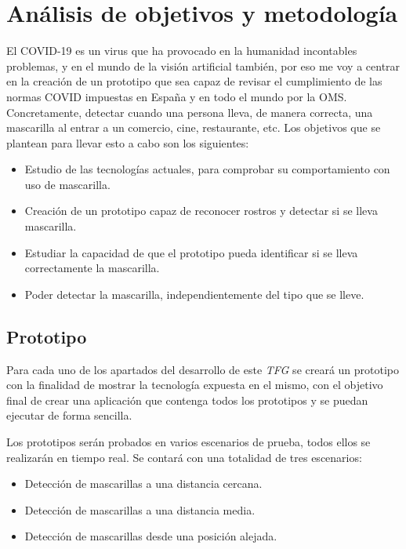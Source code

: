 
\lstset{frame=single,basicstyle=\ttfamily\small}

\chapter{Análisis de objetivos y metodología}
\vspace{-1cm}
El COVID-19 es un virus que ha provocado en la humanidad incontables problemas, y en el mundo de la visión artificial también, por eso me voy a centrar en la creación de un prototipo que sea capaz de revisar el cumplimiento de las normas COVID impuestas en España y en todo el mundo por la OMS. Concretamente, detectar cuando una persona lleva, de manera correcta, una mascarilla al entrar a un comercio, cine, restaurante, etc. Los objetivos que se plantean para llevar esto a cabo son los siguientes:

\begin{itemize}
	\item Estudio de las tecnologías actuales, para comprobar su comportamiento con uso de mascarilla.
	\item Creación de un prototipo capaz de reconocer rostros y detectar si se lleva mascarilla.
	\item Estudiar la capacidad de que el prototipo pueda identificar si se lleva correctamente la mascarilla. 
	\item Poder detectar la mascarilla, independientemente del tipo que se lleve.
\end{itemize}
\vspace{-0.7cm}
\section{Prototipo}
\vspace{-0.5cm}
Para cada uno de los apartados del desarrollo de este \textit{TFG} se creará un prototipo con la finalidad de mostrar la tecnología expuesta en el mismo, con el objetivo final de crear una aplicación que contenga todos los prototipos y se puedan ejecutar de forma sencilla. 

Los prototipos serán probados en varios escenarios de prueba, todos ellos se realizarán en tiempo real. Se contará con una totalidad de tres escenarios:

\begin{itemize}
	\item Detección de mascarillas a una distancia cercana.
	\item Detección de mascarillas a una distancia media.
	\item Detección de mascarillas desde una posición alejada.
\end{itemize}


